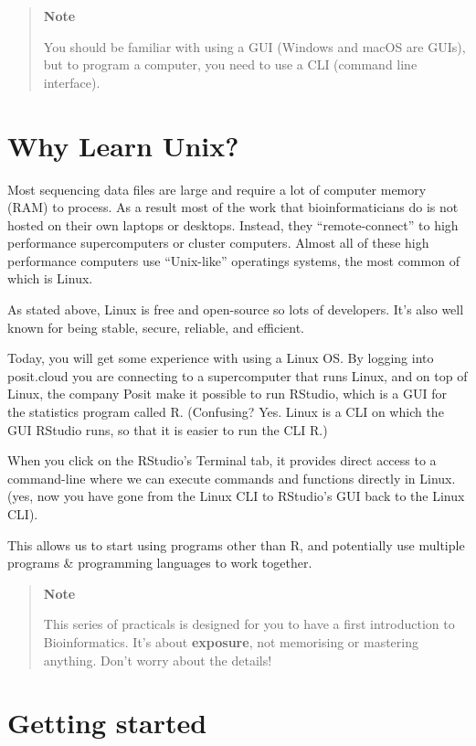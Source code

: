 \documentclass[
]{book}
\begin{document}
\begin{quote}
\textbf{Note}

You should be familiar with using a GUI (Windows and macOS are GUIs), but to program a computer, you need to use a CLI (command line interface).
\end{quote}

\hypertarget{why-learn-unix}{%
\section{Why Learn Unix?}\label{why-learn-unix}}

Most sequencing data files are large and require a lot of computer memory (RAM) to process. As a result most of the work that bioinformaticians do is not hosted on their own laptops or desktops. Instead, they ``remote-connect'' to high performance supercomputers or cluster computers. Almost all of these high performance computers use ``Unix-like'' operatings systems, the most common of which is Linux.

As stated above, Linux is free and open-source so lots of developers. It's also well known for being stable, secure, reliable, and efficient.

Today, you will get some experience with using a Linux OS. By logging into posit.cloud you are connecting to a supercomputer that runs Linux, and on top of Linux, the company Posit make it possible to run RStudio, which is a GUI for the statistics program called R. (Confusing? Yes. Linux is a CLI on which the GUI RStudio runs, so that it is easier to run the CLI R.)

When you click on the RStudio's Terminal tab, it provides direct access to a command-line where we can execute commands and functions directly in Linux. (yes, now you have gone from the Linux CLI to RStudio's GUI back to the Linux CLI).

This allows us to start using programs other than R, and potentially use multiple programs \& programming languages to work together.

\begin{quote}
\textbf{Note}

This series of practicals is designed for you to have a first introduction to Bioinformatics. It's about \textbf{exposure}, not memorising or mastering anything. Don't worry about the details!
\end{quote}

\hypertarget{getting-started}{%
\section{Getting started}\label{getting-started}}
\end{document}
